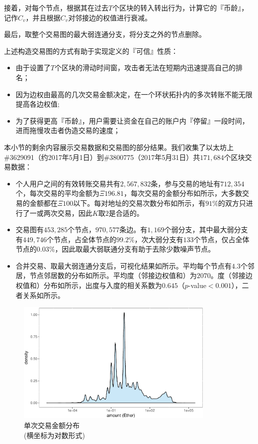 接着，对每个节点，根据其在过去$T$个区块的转入转出行为，计算它的『币龄』，记作$C_v$，并且根据$C_v$对邻接边的权值进行衰减。

最后，取整个交易图的最大弱连通分支，将分支之外的节点删除。

上述构造交易图的方式有助于实现定义的『可信』性质：
\begin{itemize}
	\item 由于设置了$T$个区块的滑动时间窗，攻击者无法在短期内迅速提高自己的排名；
	\item 因为边权由最高的几次交易金额决定，在一个环状拓扑内的多次转账不能无限提高各边权值;
	\item 为了获得更高『币龄』，用户需要让资金在自己的账户内『停留』一段时间，进而拖慢攻击者伪造交易的速度；
\end{itemize}

本小节的剩余内容展示交易数据和交易图的部分结果。我们收集了以太坊上\#3629091（约2017年5月1日）到\#3800775（2017年5月31日）共$171,684$个区块交易数据：
\begin{itemize}
	\item 个人用户之间的有效转账交易共有$2,567,832$条，参与交易的地址有$712,354$个，每次交易的平均金额为$\Xi 196.81$，每次交易的金额分布如所示，大多数交易的金额都在$\Xi 100$以下。每对地址的交易次数分布如所示，有$91\%$的双方只进行了一或两次交易，因此$K$取$2$是合适的。
	\item 交易图有$453,285$个节点，$970,577$条边。有$1,169$个弱分支，其中最大弱分支有$449,746$个节点，占全体节点的$99.2\%$，次大弱分支有$133$个节点，仅占全体节点的$0.03\%$，因此取最大弱联通分支有助于去除少数噪声节点。
	\item 合并交易、取最大弱连通分支后，可视化结果如所示。平均每个节点有$4.3$个邻居，节点邻居数的分布如所示。平均度（邻接边权值和）为$2070$。度（邻接边权值和）分布如所示，出度与入度的相关系数为$0.645$（$p$-value$<0.001$），二者关系如所示。
\end{itemize}

\begin{figure}
	\centering
	\includegraphics[width=0.85\textwidth]{figs/txad.pdf}
	\caption{单次交易金额分布 \\ \small{(横坐标为对数形式)}}\label{fig:txad}
\end{figure}

